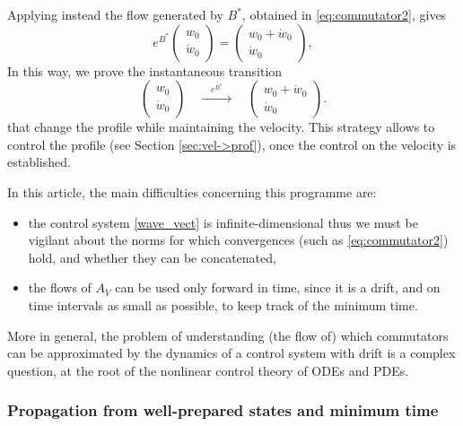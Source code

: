 \documentclass[a4paper]{article}
\theoremstyle{plain}
\begin{document}
\medskip 

Applying instead the flow generated by $B^*$, obtained in \eqref{eq:commutator2}, gives 
\begin{equation}\label{eq:flow-of-B*}
e^{B^*}\begin{pmatrix}
    w_0 \\ \dot{w}_0
\end{pmatrix}=
 \begin{pmatrix}
    w_0+\dot{w}_0 \\ \dot{w}_0
\end{pmatrix},
\end{equation}
In this way, we prove the instantaneous transition
\begin{equation} \label{exp(aB*)_target}
\begin{pmatrix}
    w_0 \\ \dot{w}_0
\end{pmatrix}
\quad \xrightarrow[]{\quad e^{B^*} \quad } \quad
 \begin{pmatrix}
    w_0 +   \dot{w}_{0} \\ \dot{w}_0
\end{pmatrix}.
\end{equation}
that change the profile while maintaining the velocity. This strategy allows to control the profile (see Section \ref{sec:vel->prof}), once the control on the velocity is established. 

\medskip

In this article, the main difficulties concerning this programme are:
\begin{itemize}[topsep=0cm, parsep=0cm, itemsep=0cm]
    \item the control system \eqref{wave_vect} is infinite-dimensional thus we must be vigilant about the norms for which convergences (such as \eqref{eq:commutator2}) hold, and whether they can be concatenated,
    \item the flows of $A_V$ can be used only forward in time, since it is a drift, and on time intervals as small as possible, to keep track of the minimum time.
\end{itemize}
More in general, the problem of understanding (the flow of) which commutators can be approximated by the dynamics of a control system with drift is a complex question, at the root of the nonlinear control theory of ODEs and PDEs.


\subsubsection{Propagation from well-prepared states and minimum time}
\end{document}
